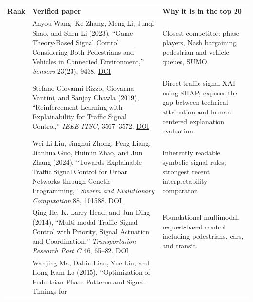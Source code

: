 \documentclass[
  english,
  11pt,
  a4paper,
]{article}
\newcounter{none} %
\begin{document}
{\def\LTcaptype{none} %
\begin{longtable}[]{@{}
  >{\raggedleft\arraybackslash}p{}
  >{\raggedright\arraybackslash}p{}
  >{\raggedright\arraybackslash}p{}@{}}
\toprule\noalign{}
\begin{minipage}[b]{\linewidth}\raggedleft
Rank
\end{minipage} & \begin{minipage}[b]{\linewidth}\raggedright
Verified paper
\end{minipage} & \begin{minipage}[b]{\linewidth}\raggedright
Why it is in the top 20
\end{minipage} \\
\midrule\noalign{}
\endhead
\bottomrule\noalign{}
\endlastfoot
1 & Anyou Wang, Ke Zhang, Meng Li, Junqi Shao, and Shen Li (2023),
``Game Theory-Based Signal Control Considering Both Pedestrians and
Vehicles in Connected Environment,'' \emph{Sensors} 23(23), 9438.
\href{https://doi.org/10.3390/s23239438}{DOI} & Closest competitor:
phase players, Nash bargaining, pedestrian and vehicle queues, SUMO. \\
2 & Stefano Giovanni Rizzo, Giovanna Vantini, and Sanjay Chawla (2019),
``Reinforcement Learning with Explainability for Traffic Signal
Control,'' \emph{IEEE ITSC}, 3567--3572.
\href{https://doi.org/10.1109/ITSC.2019.8917519}{DOI} & Direct
traffic-signal XAI using SHAP; exposes the gap between technical
attribution and human-centered explanation evaluation. \\
3 & Wei-Li Liu, Jinghui Zhong, Peng Liang, Jianhua Guo, Huimin Zhao, and
Jun Zhang (2024), ``Towards Explainable Traffic Signal Control for Urban
Networks through Genetic Programming,'' \emph{Swarm and Evolutionary
Computation} 88, 101588.
\href{https://doi.org/10.1016/j.swevo.2024.101588}{DOI} & Inherently
readable symbolic signal rules; strongest recent interpretability
comparator. \\
4 & Qing He, K. Larry Head, and Jun Ding (2014), ``Multi-modal Traffic
Signal Control with Priority, Signal Actuation and Coordination,''
\emph{Transportation Research Part C} 46, 65--82.
\href{https://doi.org/10.1016/j.trc.2014.05.001}{DOI} & Foundational
multimodal, request-based control including pedestrians, cars, and
transit. \\
5 & Wanjing Ma, Dabin Liao, Yue Liu, and Hong Kam Lo (2015),
``Optimization of Pedestrian Phase Patterns and Signal Timings for

\end{longtable}}
\end{document}
